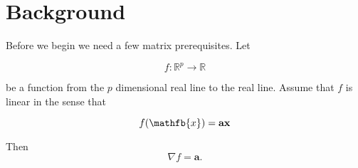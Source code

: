 \chapter{Background}

Before we begin we need a few matrix prerequisites. Let

$$
f: \mathbb{R}^p \rightarrow \mathbb{R}
$$

be a function from the $p$ dimensional real line to the real line.
Assume that $f$ is linear in the sense that

$$
f(\mathfb{x}) = \mathbf{a x}
$$

Then $$ \nabla f = \mathbf{a}.$$


